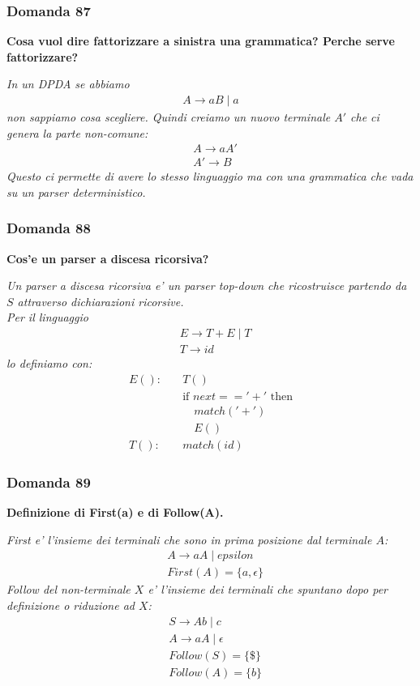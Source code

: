 \documentclass[12pt,a4paper,tikz,border=5pt]{article}
\newcommand{\domanda}[3]{%
  \subsubsection*{Domanda #1}
  \textbf{#2}
  \begin{mdframed}[backgroundcolor=grigiochiarissimo, linecolor=gray!50, linewidth=0.6pt, innertopmargin=6pt, innerbottommargin=12pt, innerleftmargin=8pt, innerrightmargin=8pt]
    \textit{#3}%
  \end{mdframed}%
  \vspace{0.4em}
}
\begin{document}
\domanda{87}{Cosa vuol dire fattorizzare a sinistra una grammatica? Perche serve fattorizzare?}{In un DPDA se abbiamo
\begin{align*}
  A \to aB \mid a
\end{align*}
non sappiamo cosa scegliere. Quindi creiamo un nuovo terminale $A'$ che ci genera la parte non-comune:
\begin{align*}
  &A \to aA'\\
  &A' \to B
\end{align*}
Questo ci permette di avere lo stesso linguaggio ma con una grammatica che vada su un parser deterministico.}

\domanda{88}{Cos'e un parser a discesa ricorsiva?}{Un parser a discesa ricorsiva e' un parser top-down che ricostruisce partendo da $S$ attraverso dichiarazioni ricorsive.\\
Per il linguaggio
\begin{align*}
  &E \to T + E \mid T \\
  &T \to id
\end{align*}
lo definiamo con:
\[
\begin{aligned}
E(): \quad & T() \\
          & \text{if } next == '+' \text{ then} \\
          & \quad match('+') \\
          & \quad E() \\[2mm]
T(): \quad & match(id)
\end{aligned}
\]
}

\domanda{89}{Definizione di First(a) e di Follow(A).}{First e' l'insieme dei terminali che sono in prima posizione dal terminale $A$:
\begin{align*}
  &A \to aA \mid epsilon\\
  &First(A)=\{a, \epsilon\}
\end{align*}
Follow del non-terminale $X$ e' l'insieme dei terminali che spuntano dopo per definizione o riduzione ad $X$:
\begin{align*}
  &S \to Ab \mid c \\
  &A \to aA \mid \epsilon\\
  &Follow(S) = \{\$\}\\
  &Follow(A)=\{b\}
\end{align*}}
\end{document}
